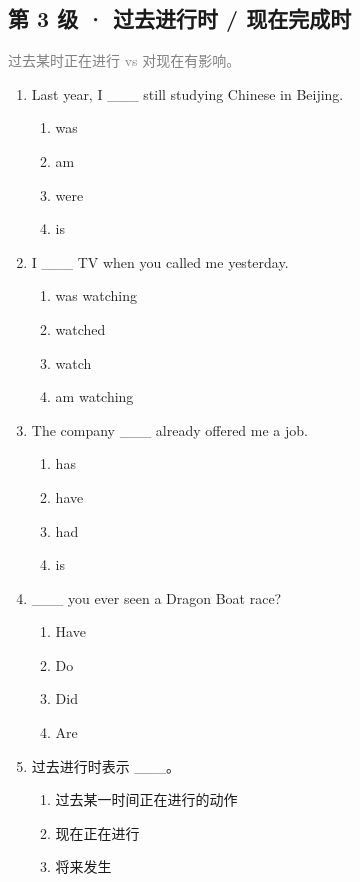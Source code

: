 \documentclass[11pt,a4paper]{ctexart}
\begin{document}
\subsection*{第 3 级 · 过去进行时 / 现在完成时}
\noindent\textcolor{gray}{过去某时正在进行 vs 对现在有影响。}\par\smallskip
\begin{enumerate}[leftmargin=*,itemsep=4pt]
\item Last year, I \_\_\_ still studying Chinese in Beijing.
\begin{enumerate}[label=\Alph*.,leftmargin=2em,itemsep=1pt,topsep=2pt]
\item was
\item am
\item were
\item is
\end{enumerate}
\item I \_\_\_ TV when you called me yesterday.
\begin{enumerate}[label=\Alph*.,leftmargin=2em,itemsep=1pt,topsep=2pt]
\item was watching
\item watched
\item watch
\item am watching
\end{enumerate}
\item The company \_\_\_ already offered me a job.
\begin{enumerate}[label=\Alph*.,leftmargin=2em,itemsep=1pt,topsep=2pt]
\item has
\item have
\item had
\item is
\end{enumerate}
\item \_\_\_ you ever seen a Dragon Boat race?
\begin{enumerate}[label=\Alph*.,leftmargin=2em,itemsep=1pt,topsep=2pt]
\item Have
\item Do
\item Did
\item Are
\end{enumerate}
\item 过去进行时表示 \_\_\_。
\begin{enumerate}[label=\Alph*.,leftmargin=2em,itemsep=1pt,topsep=2pt]
\item 过去某一时间正在进行的动作
\item 现在正在进行
\item 将来发生

\end{enumerate}
\end{enumerate}
\end{document}
